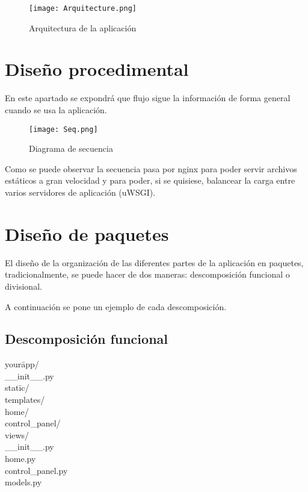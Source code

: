 \begin{figure}
	\centering
	\texttt{[image: Arquitecture.png]}
	\caption{Arquitectura de la aplicación}\label{fig:Arquitecture.png}
\end{figure}


\section{Diseño procedimental}
En este apartado se expondrá que flujo sigue la información de forma general cuando se usa la aplicación.


\begin{figure}
	\centering
	\texttt{[image: Seq.png]}
	\caption{Diagrama de secuencia}\label{fig:Seq.png}
\end{figure}

Como se puede observar la secuencia pasa por nginx para poder servir archivos estáticos a gran velocidad y para poder, si se quisiese, balancear la carga entre varios servidores de aplicación (uWSGI).


\section{Diseño de paquetes}
El diseño de la organización de las diferentes partes de la aplicación en paquetes, tradicionalmente, se puede hacer de dos maneras: descomposición funcional o divisional.

A continuación se pone un ejemplo de cada descomposición. 

\subsection{Descomposición funcional}

\begin{tabbing}
your\= app/ \\
\> \_\_init\_\_.py \\
\> stat\= ic/ \\
\> templates/ \\
\> \> home/ \\
\> \> control\_panel/ \\
\> views/ \\
\>\>\_\_init\_\_.py \\
\> \> home.py \\
\> \> control\_panel.py \\
\> models.py \\
\end{tabbing}


